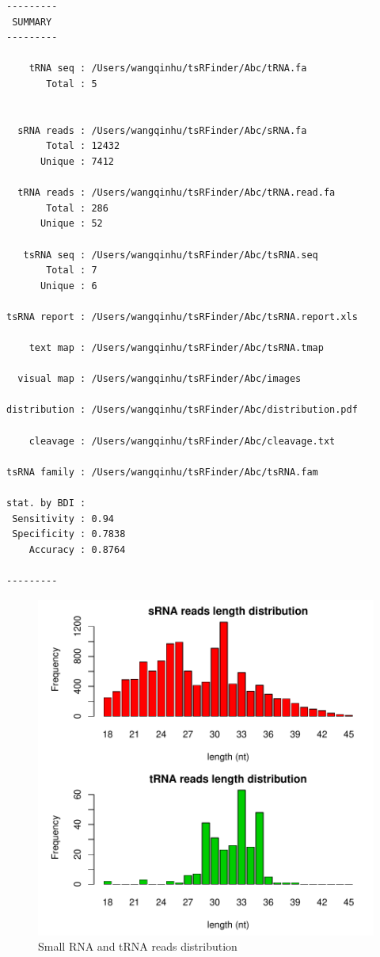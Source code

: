 \documentclass[11pt, a4paper]{article}
\begin{document}
{\small \begin{verbatim}
---------
 SUMMARY 
---------

    tRNA seq : /Users/wangqinhu/tsRFinder/Abc/tRNA.fa
       Total : 5


  sRNA reads : /Users/wangqinhu/tsRFinder/Abc/sRNA.fa
       Total : 12432
      Unique : 7412

  tRNA reads : /Users/wangqinhu/tsRFinder/Abc/tRNA.read.fa
       Total : 286
      Unique : 52

   tsRNA seq : /Users/wangqinhu/tsRFinder/Abc/tsRNA.seq
       Total : 7
      Unique : 6

tsRNA report : /Users/wangqinhu/tsRFinder/Abc/tsRNA.report.xls

    text map : /Users/wangqinhu/tsRFinder/Abc/tsRNA.tmap

  visual map : /Users/wangqinhu/tsRFinder/Abc/images

distribution : /Users/wangqinhu/tsRFinder/Abc/distribution.pdf

    cleavage : /Users/wangqinhu/tsRFinder/Abc/cleavage.txt

tsRNA family : /Users/wangqinhu/tsRFinder/Abc/tsRNA.fam

stat. by BDI :
 Sensitivity : 0.94
 Specificity : 0.7838
    Accuracy : 0.8764

---------
\end{verbatim}
}

\begin{figure}[htbp]
\begin{center}
\includegraphics[width=12cm]{distribution.pdf}
\caption{Small RNA and tRNA reads distribution}
\label{distribution}
\end{center}
\end{figure}
\end{document}
